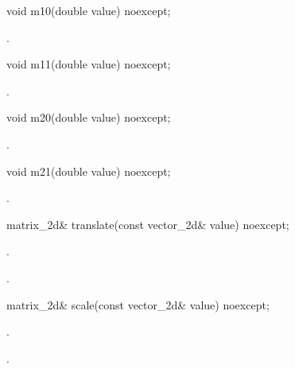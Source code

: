 \begin{itemdecl}
	void m10(double value) noexcept;
\end{itemdecl}
\begin{itemdescr}
	\pnum
	\postconditions
	.
	
\end{itemdescr}

\begin{itemdecl}
	void m11(double value) noexcept;
\end{itemdecl}
\begin{itemdescr}
	\pnum
	\postconditions
	.
	
\end{itemdescr}

\begin{itemdecl}
	void m20(double value) noexcept;
\end{itemdecl}
\begin{itemdescr}
	\pnum
	\postconditions
	.
	
\end{itemdescr}

\begin{itemdecl}
	void m21(double value) noexcept;
\end{itemdecl}
\begin{itemdescr}
	\pnum
	\postconditions
	.
	
\end{itemdescr}

\begin{itemdecl}
matrix_2d& translate(const vector_2d& value) noexcept;
\end{itemdecl}
\begin{itemdescr}
	\pnum
	\effects
	.
	
	\pnum
	\returns
	.
\end{itemdescr}

\begin{itemdecl}
matrix_2d& scale(const vector_2d& value) noexcept;
\end{itemdecl}
\begin{itemdescr}
	\pnum
	\effects
	.
	
	\pnum
	\returns
	.
\end{itemdescr}

